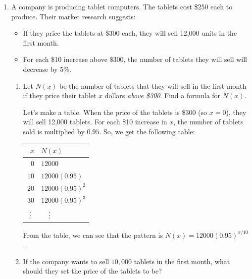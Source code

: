 \documentclass{article}
\theoremstyle{theorem}
\begin{document}
\begin{enumerate}
  \pspace{\newpage}

\item 
  \label{fall2012-ma-prefinal-1-modified}  
\finishexam

  A company is producing tablet computers. The tablets cost \$250 each to produce. Their market research suggests:

  \begin{itemize}[nosep]    
  \item If they price the tablets at \$300 each, they will sell 12,000 units in the first month.
  \item For each \$10 increase above \$300, the number of tablets they will sell will decrease by 5\%.
  \end{itemize}

  \begin{enumerate}

  \item
    \begin{problem}[\vfill]
      Let $N(x)$ be the number of tablets that they will sell in the first
      month if they price their tablet $x$ dollars {\it above \$300}.
      Find a formula for $N(x)$.
    \end{problem}

    \begin{solution}
      Let's make a table. When the price of the tablets is \$300 (so $x = 0$), they will sell 12,000 tablets. For each \$10 increase in $x$, the number of tablets sold is multiplied by $0.95$. So, we get the following table:
      \begin{center}
        \begin{tabular}{r | l}
          $x$ & $N(x)$ \\
          \hline
          $0$ & $12000$ \\
          $10$ & $12000 (0.95)$ \\
          $20$ & $12000 (0.95)^2$ \\
          $30$ & $12000 (0.95)^3$ \\
          $\mathrel{\makebox[\widthof{30}]{\vdots}}$ &
          $\mathrel{\makebox[\widthof{12000}]{\vdots}}$
        \end{tabular}
      \end{center}
      From the table, we can see that the pattern is $\boxed{N(x) = 12000 (0.95)^{x/10}}$.
    \end{solution}

  \item
    \begin{problem}[\vfill\newpage]
      If the company wants to sell $10,000$ tablets in the first month, 
      what should they set the price of the tablets to be?
    \end{problem}


\end{enumerate}
\end{enumerate}
\end{document}
